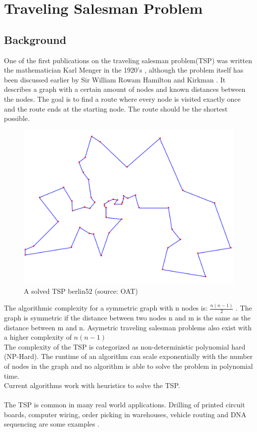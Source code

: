 \chapter{Traveling Salesman Problem}
\label{chap:tsp}
\section{Background}
One of the first publications on the traveling salesman problem(TSP) was written the mathematician Karl Menger in the 1920's \cite{Applegate}, although the problem itself has been discussed earlier by Sir William Rowam Hamilton and Kirkman \cite{Matai10}. It describes a graph with a certain amount of nodes and known distances between the nodes. The goal is to find a route where every node is visited exactly once and the route ends at the starting node. The route should be the shortest possible.
\begin{figure}[H]
	\includegraphics[]{Images/berlin52.png}
	\caption{A solved TSP berlin52 (source: OAT)}
	\label{berlin52}
\end{figure}
\newpage
The algorithmic complexity for a symmetric graph with n nodes is: $\frac{n(n-1)}{2}$ \cite{Applegate}.
The graph is symmetric if the distance between two nodes n and m is the same as the distance between m and n. Asymetric traveling salesman problems also exist with a higher complexity of $n(n-1)$\\
The complexity of the TSP is categorized as non-deterministic polynomial hard (NP-Hard). The runtime of an algorithm can scale exponentially with the number of nodes in the graph and no algorithm is able to solve the problem in polynomial time.\\
Current algorithms work with heuristics to solve the TSP.\\\\
The TSP is common in many real world applications. Drilling of printed circuit boards, computer wiring, order picking in warehouses, vehicle routing and DNA sequencing are some examples \cite{Matai10}.

